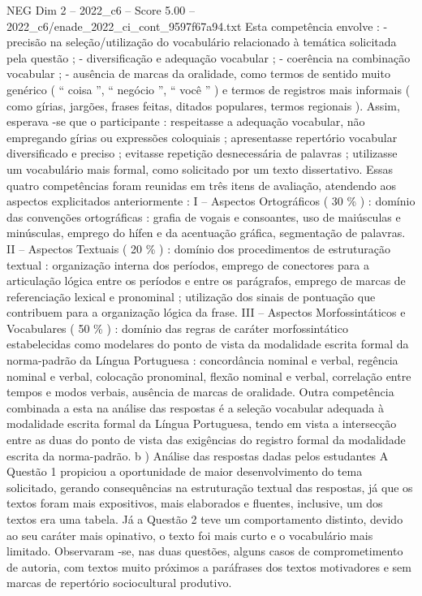 \begin{textsample}{NEG Dim 2 – 2022\_c6 – Score 5.00 – 2022\_c6/enade\_2022\_ci\_cont\_9597f67a94.txt}
Esta competência envolve : - precisão na seleção/utilização do vocabulário relacionado à temática solicitada pela questão ; - diversificação e adequação vocabular ; - coerência na combinação vocabular ; - ausência de marcas da oralidade, como termos de sentido muito genérico ( “ coisa ”, “ negócio ”, “ você ” ) e termos de registros mais informais ( como gírias, jargões, frases feitas, ditados populares, termos regionais ).
Assim, esperava -se que o participante : respeitasse a adequação vocabular, não empregando gírias ou expressões coloquiais ; apresentasse repertório vocabular diversificado e preciso ; evitasse repetição desnecessária de palavras ; utilizasse um vocabulário mais formal, como solicitado por um texto dissertativo.
Essas quatro competências foram reunidas em três itens de avaliação, atendendo aos aspectos explicitados anteriormente : I – Aspectos Ortográficos ( 30 \% ) : domínio das convenções ortográficas : grafia de vogais e consoantes, uso de maiúsculas e minúsculas, emprego do hífen e da acentuação gráfica, segmentação de palavras.
II – Aspectos Textuais ( 20 \% ) : domínio dos procedimentos de estruturação textual : organização interna dos períodos, emprego de conectores para a articulação lógica entre os períodos e entre os parágrafos, emprego de marcas de referenciação lexical e pronominal ; utilização dos sinais de pontuação que contribuem para a organização lógica da frase.
III – Aspectos Morfossintáticos e Vocabulares ( 50 \% ) : domínio das regras de caráter morfossintático estabelecidas como modelares do ponto de vista da modalidade escrita formal da norma-padrão da Língua Portuguesa : concordância nominal e verbal, regência nominal e verbal, colocação pronominal, flexão nominal e verbal, correlação entre tempos e modos verbais, ausência de marcas de oralidade.
Outra competência combinada a esta na análise das respostas é a seleção vocabular adequada à modalidade escrita formal da Língua Portuguesa, tendo em vista a intersecção entre as duas do ponto de vista das exigências do registro formal da modalidade escrita da norma-padrão. b ) Análise das respostas dadas pelos estudantes A Questão 1 propiciou a oportunidade de maior desenvolvimento do tema solicitado, gerando consequências na estruturação textual das respostas, já que os textos foram mais expositivos, mais elaborados e fluentes, inclusive, um dos textos era uma tabela.
Já a Questão 2 teve um comportamento distinto, devido ao seu caráter mais opinativo, o texto foi mais curto e o vocabulário mais limitado.
Observaram -se, nas duas questões, alguns casos de comprometimento de autoria, com textos muito próximos a paráfrases dos textos motivadores e sem marcas de repertório sociocultural produtivo.

\end{textsample}
